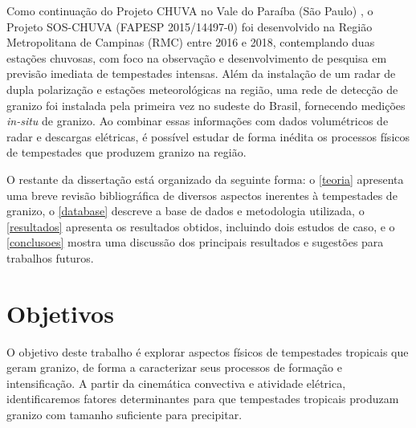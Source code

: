 Como continuação do Projeto CHUVA no Vale do Paraíba (São Paulo) \cite{Machado2014}, o Projeto SOS-CHUVA (FAPESP 2015/14497-0) foi desenvolvido na Região Metropolitana de Campinas (RMC) entre 2016 e 2018, contemplando duas estações chuvosas, com foco na observação e desenvolvimento de pesquisa em previsão imediata de tempestades intensas. Além da instalação de um radar de dupla polarização e estações meteorológicas na região, uma rede de detecção de granizo foi instalada pela primeira vez no sudeste do Brasil, fornecendo medições \textit{in-situ} de granizo. Ao combinar essas informações com dados volumétricos de radar e descargas elétricas, é possível estudar de forma inédita os processos físicos de tempestades que produzem granizo na região.

O restante da dissertação está organizado da seguinte forma: o \autoref{teoria} apresenta uma breve revisão bibliográfica de diversos aspectos inerentes à tempestades de granizo, o \autoref{database} descreve a base de dados e metodologia utilizada, o \autoref{resultados} apresenta os resultados obtidos, incluindo dois estudos de caso, e o \autoref{conclusoes} mostra uma discussão dos principais resultados e sugestões para trabalhos futuros.

\section{Objetivos}

O objetivo deste trabalho é explorar aspectos físicos de tempestades tropicais que geram granizo, de forma a caracterizar seus processos de formação e intensificação. A partir da cinemática convectiva e atividade elétrica, identificaremos fatores determinantes para que tempestades tropicais produzam granizo com tamanho suficiente para precipitar.